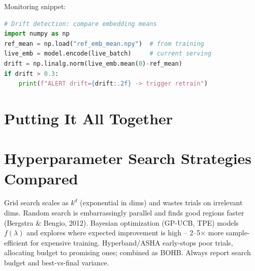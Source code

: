 Monitoring snippet:
\begin{center}
\begin{lstlisting}[language=Python]
# Drift detection: compare embedding means
import numpy as np
ref_mean = np.load("ref_emb_mean.npy")  # from training
live_emb = model.encode(live_batch)     # current serving
drift = np.linalg.norm(live_emb.mean(0)-ref_mean)
if drift > 0.3:
    print(f"ALERT drift={drift:.2f} -> trigger retrain")
\end{lstlisting}
\end{center}

\section{Putting It All Together}
\begin{center}
\end{center}

\section{Hyperparameter Search Strategies Compared}
Grid search scales as $k^d$ (exponential in dims) and wastes trials on
irrelevant dims. Random search is embarrassingly parallel and finds good
regions faster (Bergstra \& Bengio, 2012). Bayesian optimization (GP-UCB,
TPE) models $f(\lambda)$ and explores where expected improvement is high --
2--5$\times$ more sample-efficient for expensive training. Hyperband/ASHA
early-stops poor trials, allocating budget to promising ones; combined as
BOHB. Always report search budget and best-vs-final variance.


